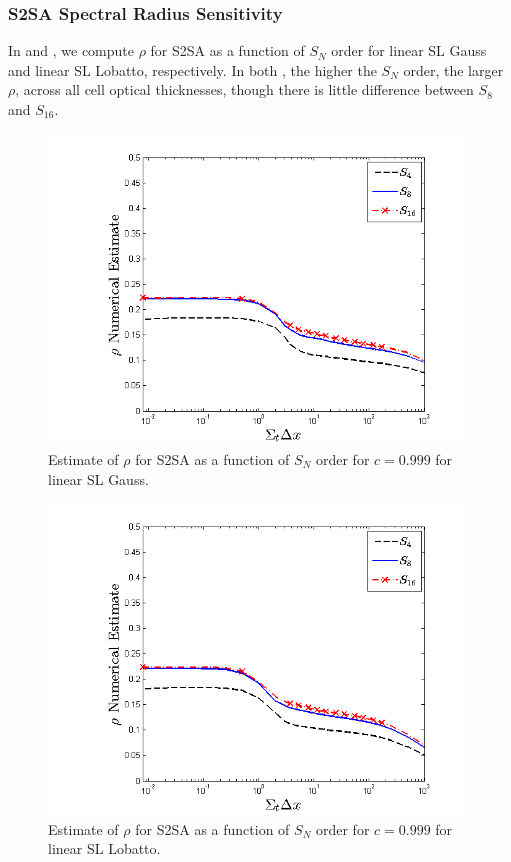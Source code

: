 \subsubsection{S2SA Spectral Radius Sensitivity}

In  and , we compute $\rho$ for S2SA as a function of $S_N$ order for linear SL Gauss and linear SL Lobatto, respectively.  In both , the higher the $S_N$ order, the larger $\rho$, across all cell optical thicknesses, though there is little difference between $S_8$ and $S_{16}$.
\begin{figure}[!hbp]
\centering
\includegraphics[width=11cm]{chapter4_acceleration/Constant_XS_sn_comparions_S2SA_Gauss.png}
\caption{Estimate of $\rho$ for S2SA as a function of $S_N$ order for $c=0.999$ for  linear SL Gauss.}
\label{fig:s2sa_gauss_as_fun_sn}
\end{figure}
%
%
\begin{figure}[!htp]
\centering
\includegraphics[width=11cm]{chapter4_acceleration/Constant_XS_sn_comparions_S2SA_Lobatto.png}
\caption{Estimate of $\rho$ for S2SA as a function of $S_N$ order for $c=0.999$ for  linear SL Lobatto.}
\label{fig:s2sa_lobatto_as_fun_sn}
\end{figure}
